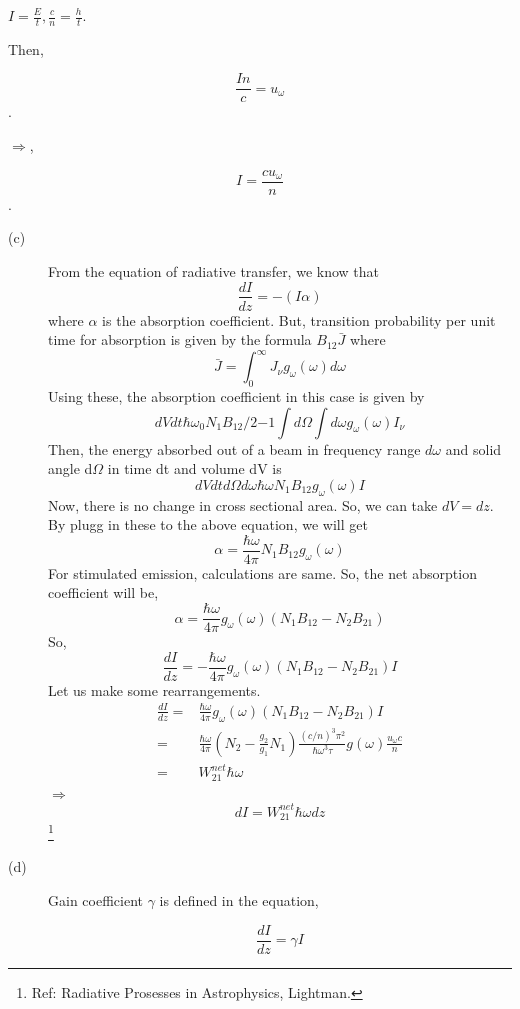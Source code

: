 \documentclass[a4paper,11pt]{article}
\begin{document}
\(I = \frac{E}{t}, \frac{c}{n}=\frac{h}{t}\).

Then, 

$$\frac{In}{c} = u_\omega$$.

\(\Rightarrow\),

$$I = \frac{c u_\omega}{n}$$.

\begin{description}
\item[{(c)}] From the equation of radiative transfer, we know that
\begin{equation}
\label{eq:org730d8c5}
 \frac{dI}{dz} = -(I \alpha)
 \end{equation}
where \(\alpha\) is the absorption coefficient.
But, transition probability per unit time for absorption is given by the formula \(B_{12}\bar{J}\) where
$$\bar{J} = \int_0^{\infty} J_\nu g_\omega(\omega) d\omega$$
Using these, the absorption coefficient in this case is given by
$$dVdt \hbar\omega_0 N_1 B_{12}/2{-1} \int d\Omega \int d\omega g_\omega(\omega) I_\nu$$
Then, the energy absorbed out of a beam in frequency range \(d\omega\) and solid angle d\(\Omega\) in time dt and volume dV is
$$dVdtd\Omega d\omega \hbar\omega N_1 B_{12} g_\omega(\omega) I $$
Now, there is no change in cross sectional area. So, we can take \(dV=dz\). By plugg in these to the above equation, we will get
$$\alpha = \frac{\hbar\omega}{4\pi} N_1 B_{12} g_\omega(\omega)$$
For stimulated emission, calculations are same. So, the net absorption coefficient will be,
$$\alpha = \frac{\hbar\omega}{4\pi}  g_\omega(\omega)(N_1 B_{12}-N_2B_{21})$$
So,
$$\frac{dI}{dz} =- \frac{\hbar\omega}{4\pi}  g_\omega(\omega)(N_1 B_{12}-N_2B_{21}) I$$
Let us make some rearrangements.
\begin{equation}
\begin{split}
\frac{dI}{dz} = & \frac{\hbar\omega}{4\pi}  g_\omega(\omega)(N_1 B_{12}-N_2B_{21}) I \\
= & \frac{\hbar\omega}{4\pi}  \left(N_2-\frac{g_2}{g_1}N_1\right)\frac{(c/n)^3 \pi^2}{\hbar \omega^3\tau} g(\omega) \frac{u_\omega c}{n} \\
= & W_{21}^{net} \hbar\omega
\end{split}
\end{equation}
\(\Rightarrow\)
$$dI =W_{21}^{net} \hbar\omega dz $$\footnote{Ref: Radiative Prosesses in Astrophysics, Lightman.}

\item[{(d)}] Gain coefficient \(\gamma\) is defined in the equation,

$$\frac{dI}{dz} = \gamma I$$
\end{description}
\end{document}
